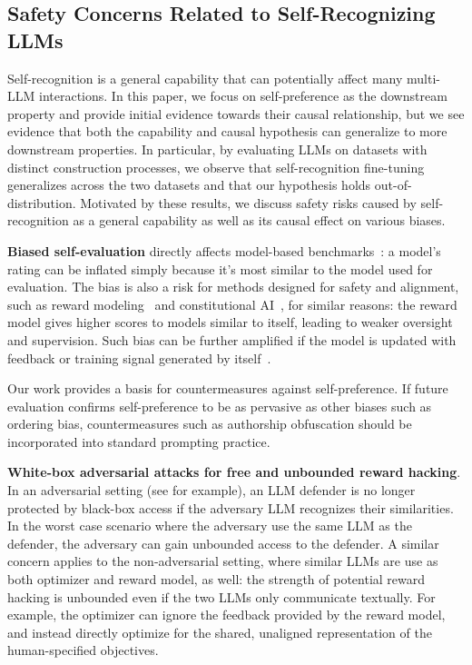 \documentclass{article}
\theoremstyle{plain}
\theoremstyle{definition}
\theoremstyle{remark}
\begin{document}

\subsection{Safety Concerns Related to Self-Recognizing LLMs}

Self-recognition is a general capability that can potentially affect many multi-LLM interactions.
In this paper, we focus on self-preference as the downstream property and provide initial evidence towards their causal relationship, but we see evidence that both the capability and causal hypothesis can generalize to more downstream properties.
In particular, by evaluating LLMs on datasets with distinct construction processes, we observe that self-recognition fine-tuning generalizes across the two datasets and that our hypothesis holds out-of-distribution.
Motivated by these results, we discuss safety risks caused by self-recognition as a general capability as well as its causal effect on various biases.

\noindent\textbf{Biased self-evaluation} directly affects model-based benchmarks~\citep{shashidharDemocratizingLLMsExploration2023, zengEvaluatingLargeLanguage2023, yuanEvaluatingInstructionTunedLarge2023, fuGPTScoreEvaluateYou2023, liAlpacaEvalAutomaticEvaluator2024}: a model's rating can be inflated simply because it's most similar to the model used for evaluation.
The bias is also a risk for methods designed for safety and alignment, such as reward modeling~\citep{leike2018scalable,stiennon2020learning} and constitutional AI~\citep{bai2022constitutional}, for similar reasons: the reward model gives higher scores to models similar to itself, leading to weaker oversight and supervision.
Such bias can be further amplified if the model is updated with feedback or training signal generated by itself~\cite{pan2024feedback,xu2024perils}.

Our work provides a basis for countermeasures against self-preference.
If future evaluation confirms self-preference to be as pervasive as other biases such as ordering bias, countermeasures such as authorship obfuscation should be incorporated into standard prompting practice.

\noindent\textbf{White-box adversarial attacks for free and unbounded reward hacking}.
In an adversarial setting (see \citet{raina2024llm} for example), an LLM defender is no longer protected by black-box access if the adversary LLM recognizes their similarities.
In the worst case scenario where the adversary use the same LLM as the defender, the adversary can gain unbounded access to the defender.
A similar concern applies to the non-adversarial setting, where similar LLMs are use as both optimizer and reward model, as well: the strength of potential reward hacking is unbounded even if the two LLMs only communicate textually.
For example, the optimizer can ignore the feedback provided by the reward model, and instead directly optimize for the shared, unaligned representation of the human-specified objectives.
\end{document}
